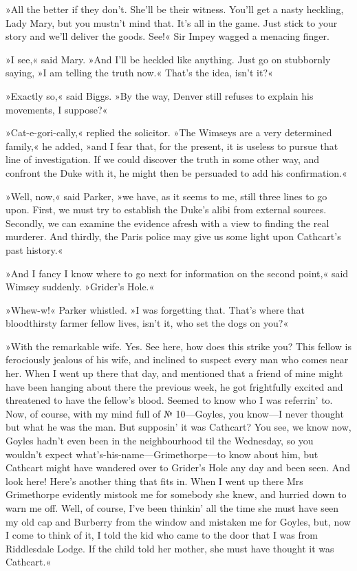 »All the better if they don't. She'll be their witness. You'll get a nasty heckling, Lady Mary, but you mustn't mind that. It's all in the game. Just stick to your story and we'll deliver the goods. See!« Sir Impey wagged a menacing finger.

»I see,« said Mary. »And I'll be heckled like anything. Just go on stubbornly saying, »I am telling the truth now.« That's the idea, isn't it?«

»Exactly so,« said Biggs. »By the way, Denver still refuses to explain his movements, I suppose?«

»Cat-e-gori-cally,« replied the solicitor. »The Wimseys are a very determined family,« he added, »and I fear that, for the present, it is useless to pursue that line of investigation. If we could discover the truth in some other way, and confront the Duke with it, he might then be persuaded to add his confirmation.«

»Well, now,« said Parker, »we have, as it seems to me, still three lines to go upon. First, we must try to establish the Duke's alibi from external sources. Secondly, we can examine the evidence afresh with a view to finding the real murderer. And thirdly, the Paris police may give us some light upon Cathcart's past history.«

»And I fancy I know where to go next for information on the second point,« said Wimsey suddenly. »Grider's Hole.«

»Whew-w!« Parker whistled. »I was forgetting that. That's where that bloodthirsty farmer fellow lives, isn't it, who set the dogs on you?«

»With the remarkable wife. Yes. See here, how does this strike you?  This fellow is ferociously jealous of his wife, and inclined to suspect every man who comes near her. When I went up there that day, and mentioned that a friend of mine might have been hanging about there the previous week, he got frightfully excited and threatened to have the fellow's blood. Seemed to know who I was referrin' to. Now, of course, with my mind full of № 10—Goyles, you know—I never thought but what he was the man. But supposin' it was Cathcart? You see, we know now, Goyles hadn't even been in the neighbourhood til the Wednesday, so you wouldn't expect what's-his-name—Grimethorpe—to know about him, but Cathcart might have wandered over to Grider's Hole any day and been seen. And look here! Here's another thing that fits in. When I went up there Mrs Grimethorpe evidently mistook me for somebody she knew, and hurried down to warn me off. Well, of course, I've been thinkin' all the time she must have seen my old cap and Burberry from the window and mistaken me for Goyles, but, now I come to think of it, I told the kid who came to the door that I was from Riddlesdale Lodge. If the child told her mother, she must have thought it was Cathcart.«

